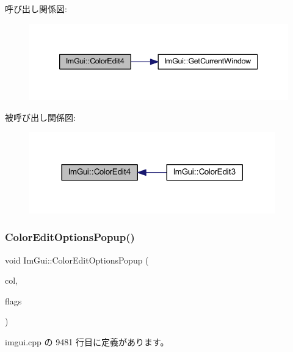 呼び出し関係図\+:\nopagebreak
\begin{figure}[H]
\begin{center}
\leavevmode
\includegraphics[width=339pt]{namespace_im_gui_ac3f45e2aa0b1d591cc8a2cdf8b566a45_cgraph}
\end{center}
\end{figure}
被呼び出し関係図\+:\nopagebreak
\begin{figure}[H]
\begin{center}
\leavevmode
\includegraphics[width=302pt]{namespace_im_gui_ac3f45e2aa0b1d591cc8a2cdf8b566a45_icgraph}
\end{center}
\end{figure}
\mbox{\label{namespace_im_gui_a6bfb117816d669f8704e5d0c0c0795fe}} 
\subsubsection{\texorpdfstring{Color\+Edit\+Options\+Popup()}{ColorEditOptionsPopup()}}
{\footnotesize\ttfamily void Im\+Gui\+::\+Color\+Edit\+Options\+Popup (\begin{DoxyParamCaption}\item[{const float $\ast$}]{col,  }\item[{\mbox{\hyperlink{imgui_8h_a6b2d5e95adc38f22c021252189f669c6}{Im\+Gui\+Color\+Edit\+Flags}}}]{flags }\end{DoxyParamCaption})}



 imgui.\+cpp の 9481 行目に定義があります。

